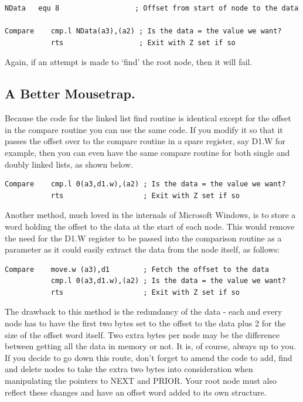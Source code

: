 \begin{lstlisting}[firstnumber=1,caption={Finding a Node - Data Comparison},label={lst:FindingANodedataComparison2}]
NData   equ 8                  ; Offset from start of node to the data

Compare    cmp.l NData(a3),(a2) ; Is the data = the value we want?
           rts                  ; Exit with Z set if so
\end{lstlisting}

Again, if an attempt is made to `find' the root node, then it will
      fail.

\subsection{A Better Mousetrap.}
\label{ch10-better-mousetrap}%

Because the code for the linked list find routine is identical
      except for the offset in the compare routine you can use the same code.
      If you modify it so that it passes the offset over to the compare
      routine in a spare register, say D1.W for example, then you can even
      have the same compare routine for both single and doubly linked lists,
      as shown below.

\begin{lstlisting}[firstnumber=1,caption={Finding a Node - Data Comparison},label={lst:FindingANodedataComparison3}]
Compare    cmp.l 0(a3,d1.w),(a2) ; Is the data = the value we want?
           rts                   ; Exit with Z set if so
\end{lstlisting}

Another method, much loved in the internals of Microsoft Windows,
      is to store a word holding the offset to the data at the start of each
      node. This would remove the need for the D1.W register to be passed into
      the comparison routine as a parameter as it could easily extract the
      data from the node itself, as follows:

\begin{lstlisting}[firstnumber=1,caption={Finding a Node - Alternative Data Comparison},label={lst:FindingANodedataComparison4}]
Compare    move.w (a3),d1        ; Fetch the offset to the data
           cmp.l 0(a3,d1.w),(a2) ; Is the data = the value we want?
           rts                   ; Exit with Z set if so
\end{lstlisting}

The drawback to this method is the redundancy of the data -{} each
      and every node has to have the first two bytes set to the offset to the
      data plus 2 for the size of the offset word itself. Two extra bytes per
      node may be the difference between getting all the data in memory or
      not. It is, of course, always up to you. If you decide to go down this
      route, don't forget to amend the code to add, find and delete nodes to
      take the extra two bytes into consideration when manipulating the
      pointers to NEXT and PRIOR. Your root node must also reflect these
      changes and have an offset word added to its own structure.

